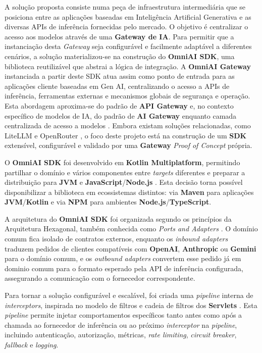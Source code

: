     A solução proposta consiste numa peça de infraestrutura intermediária que se posiciona entre as aplicações baseadas em Inteligência Artificial Generativa e as diversas APIs de inferência fornecidas pelo mercado. O objetivo é centralizar o acesso aos modelos através de uma \textbf{Gateway de IA}. Para permitir que a instanciação desta \textit{Gateway} seja configurável e facilmente adaptável a diferentes cenários, a solução materializou-se na construção do \textbf{OmniAI SDK}, uma biblioteca reutilizável que abstrai a lógica de integração. A \textbf{OmniAI Gateway} instanciada a partir deste SDK atua assim como ponto de entrada para as aplicações cliente baseadas em Gen AI, centralizando o acesso a APIs de inferência, ferramentas externas e mecanismos globais de segurança e operação. Esta abordagem aproxima-se do padrão de \textbf{API Gateway} \cite{api_gateway_design} e, no contexto específico de modelos de IA, do padrão de \textbf{AI Gateway} enquanto camada centralizada de acesso a modelos \cite{ai_gateway_pattern,karl_ai_gateway}. Embora existam soluções relacionadas, como LiteLLM e OpenRouter \cite{litellm,openrouter}, o foco deste projeto está na construção de um \textbf{SDK} extensível, configurável e validado por uma \textbf{Gateway} \textit{Proof of Concept} própria.

    O \textbf{OmniAI SDK} foi desenvolvido em \textbf{Kotlin Multiplatform}, permitindo partilhar o domínio e vários componentes entre \textit{targets} diferentes e preparar a distribuição para \textbf{JVM} e \textbf{JavaScript}/\textbf{Node.js} \cite{kotlin_multiplatform}. Esta decisão torna possível disponibilizar a biblioteca em ecossistemas distintos: via \textbf{Maven} para aplicações \textbf{JVM}/\textbf{Kotlin} e via \textbf{NPM} para ambientes \textbf{Node.js}/\textbf{TypeScript}.

    A arquitetura do \textbf{OmniAI SDK} foi organizada segundo os princípios da Arquitetura Hexagonal, também conhecida como \textit{Ports and Adapters} \cite{hexagonal_ports}. O domínio comum fica isolado de contratos externos, enquanto os \textit{inbound adapters} traduzem pedidos de clientes compatíveis com \textbf{OpenAI}, \textbf{Anthropic} ou \textbf{Gemini} para o domínio comum, e os \textit{outbound adapters} convertem esse pedido já em dominio comum para o formato esperado pela API de inferência configurada, assegurando a comunicação com o fornecedor correspondente.

    Para tornar a solução configurável e escalável, foi criada uma \textit{pipeline} interna de \textit{interceptors}, inspirada no modelo de filtros e cadeia de filtros dos \textbf{Servlets} \cite{java_servlet_filter}\cite{java_servlet_filterchain}. Esta \textit{pipeline} permite injetar comportamentos específicos tanto antes como após a chamada ao fornecedor de inferência ou ao próximo \textit{interceptor} na \textit{pipeline}, incluindo autenticação, autorização, métricas, \textit{rate limiting}, \textit{circuit breaker}, \textit{fallback} e \textit{logging}.

